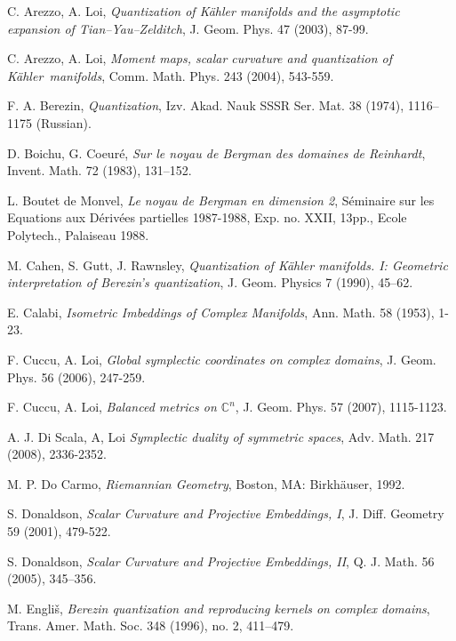 \documentclass[11pt, reqno]{amsart}
\begin{document}
\begin{thebibliography}{99}

 C. Arezzo, A. Loi,
{\em Quantization of K\"{a}hler
manifolds and the asymptotic
expansion of Tian--Yau--Zelditch},
J. Geom. Phys. 47  (2003), 87-99.

C. Arezzo, A. Loi,
{\em Moment maps, scalar curvature and quantization of {K\"{a}hler}\ manifolds},
Comm. Math.  Phys. 243 (2004), 543-559.

 F. A. Berezin, {\em
Quantization},
Izv. Akad. Nauk SSSR Ser. Mat. 38 (1974), 1116--1175 (Russian).

 D. Boichu, G. Coeur\'{e}, {\em Sur le noyau de Bergman des domaines de Reinhardt}, Invent. Math. 72 (1983), 131--152.

 L. Boutet de Monvel, {\em Le noyau de Bergman en dimension 2}, S\'{e}minaire sur les Equations aux D\'{e}riv\'{e}es partielles 1987-1988, Exp. no. XXII, 13pp., Ecole Polytech., Palaiseau 1988.

 M. Cahen, S. Gutt, J. Rawnsley, \emph{Quantization of K\"ahler manifolds. I: Geometric interpretation of Berezin's quantization}, J. Geom. Physics 7 (1990), 45--62.

 E. Calabi,
{\em Isometric Imbeddings of Complex Manifolds},
Ann. Math. 58 (1953), 1-23.

 F. Cuccu, A. Loi,
{\em Global symplectic coordinates on complex domains},
J. Geom. Phys. 56 (2006), 247-259.

 F. Cuccu,  A. Loi,
{\em Balanced metrics on ${\mathbb{C}}^n$},
J. Geom. Phys. 57 (2007), 1115-1123.

 A. J. Di Scala, A, Loi
{\em Symplectic duality of symmetric spaces},
Adv. Math. 217  (2008), 2336-2352.

 M. P. Do Carmo, \emph{Riemannian Geometry}, Boston, MA:  Birkh\"auser, 1992.

 S. Donaldson, {\em Scalar Curvature and Projective Embeddings, I}, J. Diff. Geometry 59 (2001),  479-522.

 S. Donaldson,
{\em Scalar Curvature and Projective Embeddings, II},
Q. J. Math. 56 (2005),  345--356.

M. Engli\v{s},
{\em Berezin quantization and reproducing kernels on complex domains},
Trans. Amer. Math. Soc. 348 (1996), no. 2, 411--479.


\end{thebibliography}
\end{document}
